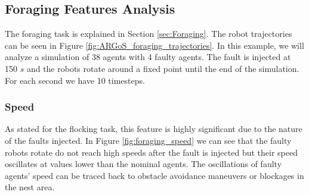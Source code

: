 \documentclass[../../Thesis.tex]{subfiles}
\begin{document}
		\subsection{Foraging Features Analysis}
			The foraging task is explained in Section \ref{sec:Foraging}. The robot trajectories can be seen in Figure \ref{fig:ARGoS_foraging_trajectories}. In this example, we will analyze a simulation of 38 agents with 4 faulty agents. The fault is injected at 150 $s$ and the robots rotate around a fixed point until the end of the simulation. For each second we have 10 timesteps.
			\subsubsection{Speed}
				As stated for the flocking task, this feature is highly significant due to the nature of the faults injected. In Figure \ref{fig:foraging_speed} we can see that the faulty robots rotate do not reach high speeds after the fault is injected but their speed oscillates at values lower than the nominal agents. The oscillations of faulty agents' speed can be traced back to obstacle avoidance maneuvers or blockages in the nest area.
\end{document}
